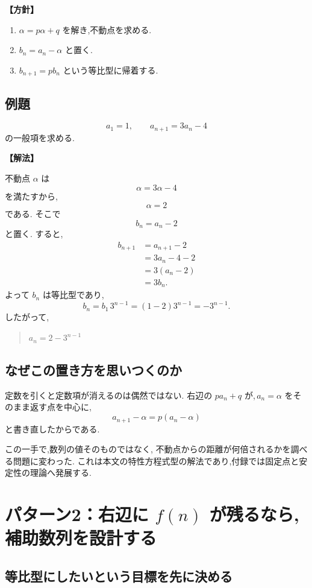 \noindent\textbf{【方針】}

\begin{enumerate}
  \item $\alpha=p\alpha+q$ を解き,不動点を求める.
  \item $b_n=a_n-\alpha$ と置く.
  \item $b_{n+1}=pb_n$ という等比型に帰着する.
\end{enumerate}

\subsection{例題}

\[
  a_1=1,\qquad a_{n+1}=3a_n-4
\]
の一般項を求める.

\noindent\textbf{【解法】}

不動点 $\alpha$ は
\[
  \alpha=3\alpha-4
\]
を満たすから,
\[
  \alpha=2
\]
である.
そこで
\[
  b_n=a_n-2
\]
と置く.
すると,
\[
\begin{aligned}
  b_{n+1}
  &=a_{n+1}-2\\
  &=3a_n-4-2\\
  &=3(a_n-2)\\
  &=3b_n.
\end{aligned}
\]
よって $b_n$ は等比型であり,
\[
  b_n=b_1\,3^{n-1}=(1-2)3^{n-1}=-3^{n-1}.
\]
したがって,
\begin{quote}
  $a_n=2-3^{n-1}$
\end{quote}

\subsection{なぜこの置き方を思いつくのか}

定数を引くと定数項が消えるのは偶然ではない.
右辺の $pa_n+q$ が,\,$a_n=\alpha$ をそのまま返す点を中心に,
\[
  a_{n+1}-\alpha=p(a_n-\alpha)
\]
と書き直したからである.

この一手で,数列の値そのものではなく,
不動点からの距離が何倍されるかを調べる問題に変わった.
これは本文の特性方程式型の解法であり,付録では固定点と安定性の理論へ発展する.

\section{パターン2：右辺に $f(n)$ が残るなら,補助数列を設計する}

\subsection{等比型にしたいという目標を先に決める}


